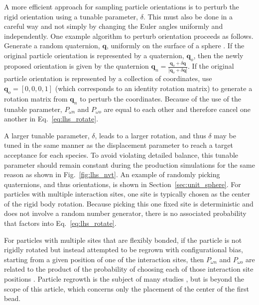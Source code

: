 \documentclass[
  9pt,
  bestpractices,
]{livecoms}
\begin{document}
A more efficient approach for sampling particle orientations is to perturb the rigid orientation using a tunable parameter, $\delta$.
This must also be done in a careful way and not simply by changing the Euler angles uniformly and independently.
One example algorithm to perturb orientation proceeds as follows.
Generate a random quaternion, $\mathbf{q}$, uniformly on the surface of a sphere \cite{vesely_angular_1982}.
If the original particle orientation is represented by a quaternion, $\mathbf{q}_o$, then the newly proposed orientation is given by the quaternion $\mathbf{q}_n=\frac{\mathbf{q}_o+\delta\mathbf{q}}{|\mathbf{q}_o+\delta\mathbf{q}|}$.
If the original particle orientation is represented by a collection of coordinates, use $\mathbf{q}_o=[0, 0, 0, 1]$ (which corresponds to an identity rotation matrix) to generate a rotation matrix from $\mathbf{q}_n$ to perturb the coordinates.
Because of the use of the tunable parameter, $P_{\omega n}$ and $P_{\omega o}$ are equal to each other and therefore cancel one another in Eq.~\ref{eq:lhs_rotate}.

A larger tunable parameter, $\delta$, leads to a larger rotation, and thus $\delta$ may be tuned in the same manner as the displacement parameter to reach a target acceptance for each species.
To avoid violating detailed balance, this tunable parameter should remain constant during the production simulations for the same reason as shown in Fig.~\ref{fig:lhs_nvt}.
An example of randomly picking quaternions, and thus orientations, is shown in Section~\ref{sec:unit_sphere}.
For particles with multiple interaction sites, one site is typically chosen as the center of the rigid body rotation.
Because picking this one fixed site is deterministic and does not involve a random number generator, there is no associated probability that factors into Eq.~\ref{eq:lhs_rotate}.

For particles with multiple sites that are flexibly bonded, if the particle is not rigidly rotated but instead attempted to be regrown with configurational bias, starting from a given position of one of the interaction sites, then $P_{\omega n}$ and $P_{\omega o}$ are related to the product of the probability of choosing each of those interaction site positions \cite{rosenbluth_monte_1955, frenkel_understanding_2002}.
Particle regrowth is the subject of many studies \cite{martin_novel_1999, martin_using_2006, sepehri_improving_2017, sepehri_improving_2017-1}, but is beyond the scope of this article, which concerns only the placement of the center of the first bead.
\end{document}
